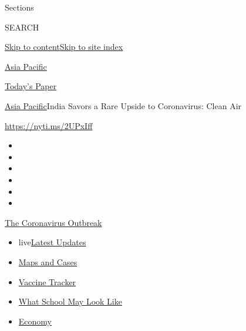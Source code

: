 Sections

SEARCH

\protect\hyperlink{site-content}{Skip to
content}\protect\hyperlink{site-index}{Skip to site index}

\href{https://www.nytimes.com/section/world/asia}{Asia Pacific}

\href{https://myaccount.nytimes.com/auth/login?response_type=cookie\&client_id=vi}{}

\href{https://www.nytimes.com/section/todayspaper}{Today's Paper}

\href{/section/world/asia}{Asia Pacific}\textbar{}India Savors a Rare
Upside to Coronavirus: Clean Air

\url{https://nyti.ms/2UPxIff}

\begin{itemize}
\item
\item
\item
\item
\item
\item
\end{itemize}

\href{https://www.nytimes.com/news-event/coronavirus?action=click\&pgtype=Article\&state=default\&region=TOP_BANNER\&context=storylines_menu}{The
Coronavirus Outbreak}

\begin{itemize}
\tightlist
\item
  live\href{https://www.nytimes.com/2020/08/02/world/coronavirus-updates.html?action=click\&pgtype=Article\&state=default\&region=TOP_BANNER\&context=storylines_menu}{Latest
  Updates}
\item
  \href{https://www.nytimes.com/interactive/2020/us/coronavirus-us-cases.html?action=click\&pgtype=Article\&state=default\&region=TOP_BANNER\&context=storylines_menu}{Maps
  and Cases}
\item
  \href{https://www.nytimes.com/interactive/2020/science/coronavirus-vaccine-tracker.html?action=click\&pgtype=Article\&state=default\&region=TOP_BANNER\&context=storylines_menu}{Vaccine
  Tracker}
\item
  \href{https://www.nytimes.com/interactive/2020/07/29/us/schools-reopening-coronavirus.html?action=click\&pgtype=Article\&state=default\&region=TOP_BANNER\&context=storylines_menu}{What
  School May Look Like}
\item
  \href{https://www.nytimes.com/live/2020/07/31/business/stock-market-today-coronavirus?action=click\&pgtype=Article\&state=default\&region=TOP_BANNER\&context=storylines_menu}{Economy}
\end{itemize}

